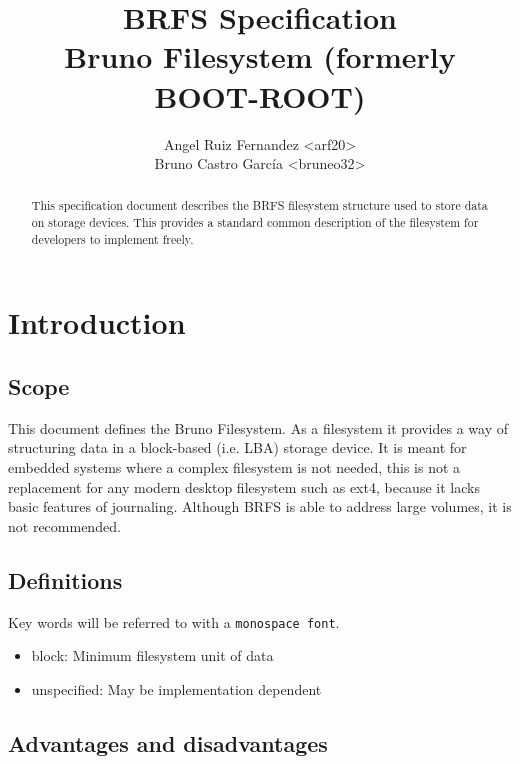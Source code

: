 \documentclass[]{article}
\title{
	\textbf{BRFS Specification} \\
	\large Bruno Filesystem (formerly BOOT-ROOT)
}
\author{
	Angel Ruiz Fernandez \textless arf20\textgreater \\
	Bruno Castro García  \textless bruneo32\textgreater
}
\begin{document}
	\maketitle
	\thispagestyle{fancy}

	\begin{abstract}
		This specification document describes the BRFS filesystem structure used to store data on storage devices. This provides a standard common description of the filesystem for developers to implement freely.
	\end{abstract}

	\begin{versionhistory}
	\end{versionhistory}

	\pagebreak

	\tableofcontents
	\pagebreak

	\section{Introduction}
	\subsection{Scope}

	This document defines the Bruno Filesystem. As a filesystem it provides a way of structuring data in a block-based (i.e. LBA) storage device. It is meant for embedded systems where a complex filesystem is not needed, this is not a replacement for any modern desktop filesystem such as ext4, because it lacks basic features of journaling. Although BRFS is able to address large volumes, it is not recommended.

	\subsection{Definitions}

	Key words will be referred to with a \texttt{monospace font}.

	\begin{itemize}
		\item block: Minimum filesystem unit of data
		\item unspecified: May be implementation dependent
	\end{itemize}

	\subsection{Advantages and disadvantages}
\end{document}
